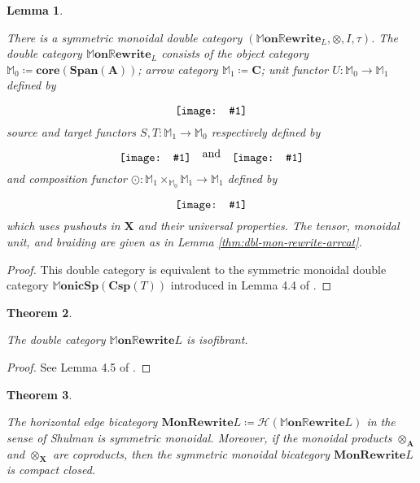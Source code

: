 \documentclass{amsart}
\newcommand{\MM}{\mathbb{M}}
\newcommand{\A}{\cat{A}}
\newcommand{\C}{\cat{C}}
\newcommand{\X}{\cat{X}}
\newcommand{\core}{\mathbf{core}}
\newcommand{\cat}[1]{\mathbf{#1}}
\newcommand{\from}{\colon}
\newcommand{\diagram}[1]{\raisebox{-0.5\height}{\texttt{[image: \#1]}}}
\newcommand{\Span}{\mathbf{Span}}
\newcommand{\MMonSpCsp}[1]{\mathbb{M}\mathbf{onicSp}(\mathbf{Csp}(#1))}
\newcommand{\MonRewrite}{ \mathbf{MonRewrite}}
\newcommand{\MMonRewrite}{ \mathbb{M}\mathbf{on}\mathbb{R}\mathbf{ewrite} }
\newtheorem{theorem}{Theorem}[section]
\newtheorem{lemma}[theorem]{Lemma}
\theoremstyle{remark}
\theoremstyle{definition}
\begin{document}
\begin{lemma}
  \label{thm:dbl-mon-rewr-smc} 

  There is a symmetric monoidal double category
  $ (\MMonRewrite_{L} , \otimes , I , \tau) $. The double category
  $ \MMonRewrite_{L} $ consists of the object category
  $ \MM_0 \coloneqq \core (\Span (\A)) $; arrow category
  $ \MM_1 \coloneqq \C $; unit functor $ U \from \MM_0 \to \MM_1 $
  defined by
  \[
    \diagram{diag_lr_dbl-mon-rewrite-unit-functor}
  \]
  source and target functors $ S , T \from \MM_1 \to \MM_0 $
  respectively defined by
  \[
    \diagram{diag_lr_dbl-mon-rewrite-source-functor}
    \quad \text{and} \quad
    \diagram{diag_lr_dbl-mon-rewrite-target-functor}
  \]
  and composition functor
  $ \odot \from \MM_1 \times_{\MM_0} \MM_1 \to \MM_1 $ defined
  by
  \[
    \diagram{diag_lr_dbl-mon-rewrite-composition-functor}
  \]
  which uses pushouts in $ \X $ and their universal properties.
  The tensor, monoidal unit, and braiding are given as in Lemma
  \ref{thm:dbl-mon-rewrite-arrcat}.
  
\end{lemma}

\begin{proof}

  This double category is equivalent to the symmetric monoidal double
  category $\MMonSpCsp{T}$ introduced in Lemma 4.4 of
  \cite{sp-csp-top}.
  
\end{proof}

\begin{theorem} \label{thm:dbl-mon-rewrite_isofibrant}
	
  The double category $ \MMonRewrite{L} $ is isofibrant.
  
\end{theorem}

\begin{proof}
	
  See Lemma 4.5 of \cite{sp-csp-top}.
  
\end{proof}

\begin{theorem}
  \label{thm:bi-mon-rewrite-scmm}

  The horizontal edge bicategory
  $ \MonRewrite{L} \coloneqq \mathcal{H} \left( \MMonRewrite{L}
  \right) $ in the sense of Shulman is symmetric monoidal.  Moreover,
  if the monoidal products $ \otimes_{\A} $ and $ \otimes_{\X} $ are
  coproducts, then the symmetric monoidal bicategory
  $ \MonRewrite{L} $ is compact closed.
  
\end{theorem}
\end{document}
